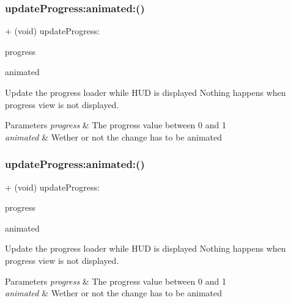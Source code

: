 \subsubsection{\texorpdfstring{update\+Progress\+:animated\+:()}{updateProgress:animated:()}\hspace{0.1cm}{\footnotesize\ttfamily [1/3]}}
{\footnotesize\ttfamily + (void) update\+Progress\+: \begin{DoxyParamCaption}\item[{(C\+G\+Float)}]{progress }\item[{animated:(B\+O\+OL)}]{animated }\end{DoxyParamCaption}}

Update the progress loader while H\+UD is displayed Nothing happens when progress view is not displayed. 
\begin{DoxyParams}{Parameters}
{\em progress} & The progress value between 0 and 1 \\
\hline
{\em animated} & Wether or not the change has to be animated \\
\hline
\end{DoxyParams}
\mbox{\label{interface_k_v_n_progress_a70c537364b9ea751af24178448335b98}} 
\subsubsection{\texorpdfstring{update\+Progress\+:animated\+:()}{updateProgress:animated:()}\hspace{0.1cm}{\footnotesize\ttfamily [2/3]}}
{\footnotesize\ttfamily + (void) update\+Progress\+: \begin{DoxyParamCaption}\item[{(C\+G\+Float)}]{progress }\item[{animated:(B\+O\+OL)}]{animated }\end{DoxyParamCaption}}

Update the progress loader while H\+UD is displayed Nothing happens when progress view is not displayed. 
\begin{DoxyParams}{Parameters}
{\em progress} & The progress value between 0 and 1 \\
\hline
{\em animated} & Wether or not the change has to be animated \\
\hline
\end{DoxyParams}
\mbox{\label{interface_k_v_n_progress_a70c537364b9ea751af24178448335b98}} 
